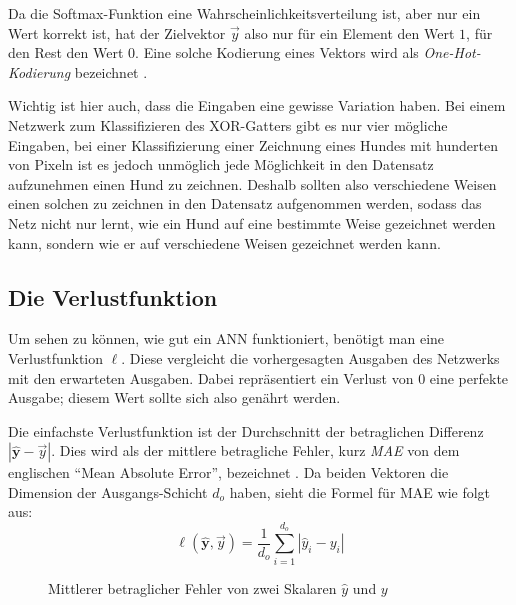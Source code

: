 \documentclass[12pt,titlepage]{article}
\begin{document}
Da die Softmax-Funktion eine Wahrscheinlichkeitsverteilung ist, aber nur ein Wert korrekt ist, hat der Zielvektor \(\vec{y}\) also nur für ein Element den Wert $1$, für den Rest den Wert $0$. Eine solche Kodierung eines Vektors wird als \textit{One-Hot-Kodierung} bezeichnet \autocite{brownleeOrdinalOneHotEncodings2020}.

Wichtig ist hier auch, dass die Eingaben eine gewisse Variation haben. Bei einem Netzwerk zum Klassifizieren des XOR-Gatters gibt es nur vier mögliche Eingaben, bei einer Klassifizierung einer Zeichnung eines Hundes mit hunderten von Pixeln ist es jedoch unmöglich jede Möglichkeit in den Datensatz aufzunehmen einen Hund zu zeichnen. Deshalb sollten also verschiedene Weisen einen solchen zu zeichnen in den Datensatz aufgenommen werden, sodass das Netz nicht nur lernt, wie ein Hund auf eine bestimmte Weise gezeichnet werden kann, sondern wie er auf verschiedene Weisen gezeichnet werden kann.

\subsection{Die Verlustfunktion} \label{sec:verlustfunktion}

Um sehen zu können, wie gut ein ANN funktioniert, benötigt man eine Verlustfunktion $\ell$. Diese vergleicht die vorhergesagten Ausgaben des Netzwerks mit den erwarteten Ausgaben. Dabei repräsentiert ein Verlust von $0$ eine perfekte Ausgabe; diesem Wert sollte sich also genährt werden.

Die einfachste Verlustfunktion ist der Durchschnitt der betraglichen Differenz $|\mathbf{\hat{y}} - \vec{y}|$. Dies wird als der mittlere betragliche Fehler, kurz \textit{MAE} von dem englischen \enquote{Mean Absolute Error}, bezeichnet \autocite{fortunerMachineLearningGlossary}. Da beiden Vektoren die Dimension der Ausgangs-Schicht $d_o$ haben, sieht die Formel für MAE wie folgt aus:
\[
  \ell(\mathbf{\hat{y}}, \vec{y}) = \frac{1}{d_o} \sum_{i=1}^{d_o} |\hat{y}_i - y_i|
\]

\begin{figure}[H]
  \centering


  \caption{Mittlerer betraglicher Fehler von zwei Skalaren $\hat{y}$ und $y$}
  \label{fig:loss}
\end{figure}
\end{document}
